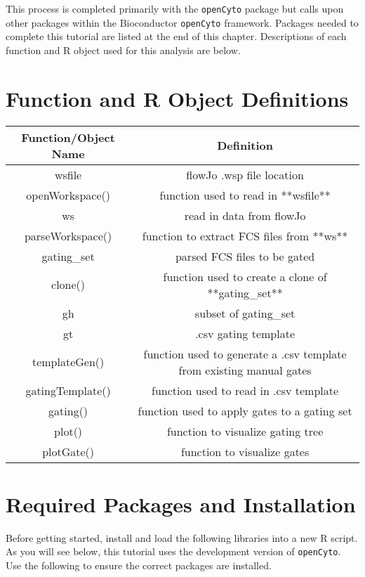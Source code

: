 \documentclass[]{book}
\begin{document}
This process is completed primarily with the \texttt{openCyto} package but calls upon other packages within the Bioconductor \texttt{openCyto} framework. Packages needed to complete this tutorial are listed at the end of this chapter. Descriptions of each function and R object used for this analysis are below.

\hypertarget{function-and-r-object-definitions}{%
\section{Function and R Object Definitions}\label{function-and-r-object-definitions}}

\begin{tabular}{c|c}
\hline
Function/Object Name & Definition\\
\hline
wsfile & flowJo .wsp file location\\
\hline
openWorkspace() & function used to read in **wsfile**\\
\hline
ws & read in data from flowJo\\
\hline
parseWorkspace() & function to extract FCS files from **ws**\\
\hline
gating\_set & parsed FCS files to be gated\\
\hline
clone() & function used to create a clone of **gating\_set**\\
\hline
gh & subset of gating\_set\\
\hline
gt & .csv gating template\\
\hline
templateGen() & function used to generate a .csv template from existing manual gates\\
\hline
gatingTemplate() & function used to read in .csv template\\
\hline
gating() & function used to apply gates to a gating set\\
\hline
plot() & function to visualize gating tree\\
\hline
plotGate() & function to visualize gates\\
\hline
\end{tabular}

\hypertarget{required-packages-and-installation}{%
\section{Required Packages and Installation}\label{required-packages-and-installation}}

Before getting started, install and load the following libraries into a new R script. As you will see below, this tutorial uses the development version of \texttt{openCyto}. Use the following to ensure the correct packages are installed.
\end{document}
